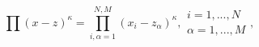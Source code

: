 \begin{equation}
	\prod(x-z)^{\kappa}=
	\prod_{i,\alpha=1}^{N,M}(x_{i}-z_{\alpha})^{\kappa},  
	\begin{array}{l}
	i=1,...,N\\
	\alpha=1,...,M
	\end{array} ,
\end{equation}

